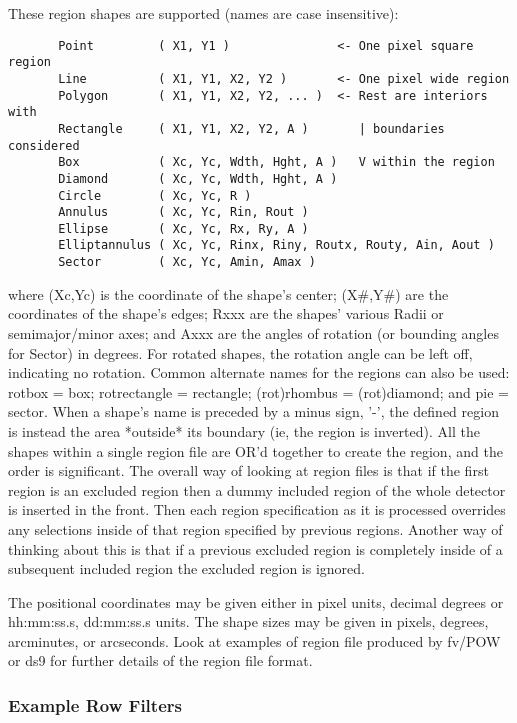 \documentclass[11pt]{article}
\begin{document}
    These region shapes are supported (names are case insensitive):
 
\begin{verbatim}
       Point         ( X1, Y1 )               <- One pixel square region
       Line          ( X1, Y1, X2, Y2 )       <- One pixel wide region
       Polygon       ( X1, Y1, X2, Y2, ... )  <- Rest are interiors with
       Rectangle     ( X1, Y1, X2, Y2, A )       | boundaries considered
       Box           ( Xc, Yc, Wdth, Hght, A )   V within the region
       Diamond       ( Xc, Yc, Wdth, Hght, A )
       Circle        ( Xc, Yc, R )
       Annulus       ( Xc, Yc, Rin, Rout )
       Ellipse       ( Xc, Yc, Rx, Ry, A )
       Elliptannulus ( Xc, Yc, Rinx, Riny, Routx, Routy, Ain, Aout )
       Sector        ( Xc, Yc, Amin, Amax )
\end{verbatim}
    where (Xc,Yc) is  the coordinate of  the shape's center; (X\#,Y\#) are
    the coordinates  of the shape's edges;  Rxxx are the shapes' various
    Radii or semimajor/minor  axes; and Axxx  are the angles of rotation
    (or bounding angles for Sector) in degrees.  For rotated shapes, the
    rotation angle  can  be left  off, indicating  no rotation.   Common
    alternate  names for the regions  can also be  used: rotbox = box;
    rotrectangle = rectangle;  (rot)rhombus = (rot)diamond;  and pie
    = sector.  When a  shape's name is  preceded by a minus sign, '-',
    the defined region  is instead the area  *outside* its boundary (ie,
    the region is inverted).  All the shapes within a single region
    file are OR'd together to create the region, and the order is
    significant. The overall way of looking at region files is that if
    the first region is an excluded region then a dummy included region
    of the whole detector is inserted in the front. Then each region
    specification as it is processed overrides any selections inside of
    that region specified by previous regions. Another way of thinking
    about this is that if a previous excluded region is completely
    inside of a subsequent included region the excluded region is
    ignored.

    The positional coordinates may be given either in pixel units,
    decimal degrees or hh:mm:ss.s, dd:mm:ss.s units.  The shape sizes
    may be given in pixels, degrees, arcminutes, or arcseconds.  Look
    at examples of region file produced by fv/POW or ds9 for further
    details of the region file format.

\subsubsection{Example Row Filters}
 
\end{document}

